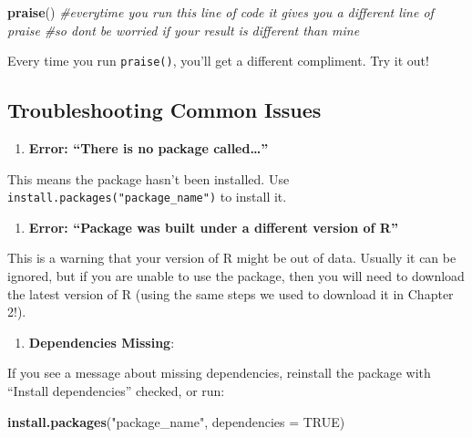 \documentclass[
]{book}
\newenvironment{Shaded}{\begin{snugshade}}{\end{snugshade}}
\newcommand{\AttributeTok}[1]{\textcolor[rgb]{0.13,0.29,0.53}{#1}}
\newcommand{\CommentTok}[1]{\textcolor[rgb]{0.56,0.35,0.01}{\textit{#1}}}
\newcommand{\ConstantTok}[1]{\textcolor[rgb]{0.56,0.35,0.01}{#1}}
\newcommand{\FunctionTok}[1]{\textcolor[rgb]{0.13,0.29,0.53}{\textbf{#1}}}
\newcommand{\NormalTok}[1]{#1}
\newcommand{\StringTok}[1]{\textcolor[rgb]{0.31,0.60,0.02}{#1}}
\providecommand{\tightlist}{%
  \setlength{\itemsep}{0pt}\setlength{\parskip}{0pt}}
\begin{document}
\begin{Shaded}
\begin{Highlighting}[]
\FunctionTok{praise}\NormalTok{() }\CommentTok{\#everytime you run this line of code it gives you a different line of praise}
\CommentTok{\#so don\textquotesingle{}t be worried if your result is different than mine}
\end{Highlighting}
\end{Shaded}

Every time you run \texttt{praise()}, you'll get a different compliment. Try it out!

\subsection{Troubleshooting Common Issues}\label{troubleshooting-common-issues}

\begin{enumerate}
\def\labelenumi{\arabic{enumi}.}
\tightlist
\item
  \textbf{Error: ``There is no package called\ldots{}''}
\end{enumerate}

This means the package hasn't been installed. Use \texttt{install.packages("package\_name")} to install it.

\begin{enumerate}
\def\labelenumi{\arabic{enumi}.}
\setcounter{enumi}{1}
\tightlist
\item
  \textbf{Error: ``Package was built under a different version of R''}
\end{enumerate}

This is a warning that your version of R might be out of data. Usually it can be ignored, but if you are unable to use the package, then you will need to download the latest version of R (using the same steps we used to download it in Chapter 2!).

\begin{enumerate}
\def\labelenumi{\arabic{enumi}.}
\setcounter{enumi}{2}
\tightlist
\item
  \textbf{Dependencies Missing}:
\end{enumerate}

If you see a message about missing dependencies, reinstall the package with ``Install dependencies'' checked, or run:

\begin{Shaded}
\begin{Highlighting}[]
\FunctionTok{install.packages}\NormalTok{(}\StringTok{"package\_name"}\NormalTok{, }\AttributeTok{dependencies =} \ConstantTok{TRUE}\NormalTok{)}
\end{Highlighting}
\end{Shaded}
\end{document}
